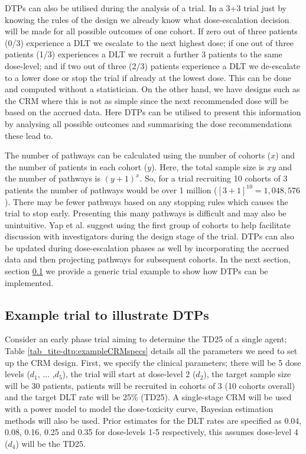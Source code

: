 DTPs can also be utilised during the analysis of a trial. In a 3+3 trial just by knowing the rules of the design we already know what dose-escalation decision will be made for all possible outcomes of one cohort. If zero out of three patients (0/3) experience a DLT we escalate to the next highest dose; if one out of three patients (1/3) experiences a DLT we recruit a further 3 patients to the same dose-level; and if two out of three (2/3) patients experience a DLT we de-escalate to a lower dose or stop the trial if already at the lowest dose. This can be done and computed without a statistician. On the other hand, we have designs such as the CRM where this is not as simple since the next recommended dose will be based on the accrued data. Here DTPs can be utilised to present this information by analysing all possible outcomes and summarising the dose recommendations these lead to.

The number of pathways can be calculated using the number of cohorts ($x$) and the number of patients in each cohort ($y$). Here, the total sample size is $xy$ and the number of pathways is $(y+1)^x$. So, for a trial recruiting 10 cohorts of 3 patients the number of pathways would be over 1 million ($[3+1]^{10} = 1,048,576$). There may be fewer pathways based on any stopping rules which causes the trial to stop early. Presenting this many pathways is difficult and may also be unintuitive. Yap et al. \cite{yapDoseTransitionPathways2017} suggest using the first group of cohorts to help facilitate discussion with investigators during the design stage of the trial. DTPs can also be updated during dose-escalation phases as well by incorporating the accrued data and then projecting pathways for subsequent cohorts. In the next section, section \ref{tite-dtp:Example-DTPs} we provide a generic trial example to show how DTPs can be implemented.  

\subsection{Example trial to illustrate DTPs}
\label{tite-dtp:Example-DTPs}

Consider an early phase trial aiming to determine the TD25 of a single agent; Table \ref{tab_tite-dtp:exampleCRMspecs} details all the parameters we need to set up the CRM design. First, we specify the clinical parameters; there will be 5 dose levels ($d_1$, ... ,$d_5$), the trial will start at dose-level 2 ($d_2$), the target sample size will be 30 patients, patients will be recruited in cohorts of 3 (10 cohorts overall) and the target DLT rate will be 25\% (TD25). A single-stage CRM will be used with a power model to model the dose-toxicity curve, Bayesian estimation methods will also be used. Prior estimates for the DLT rates are specified as 0.04, 0.08, 0.16, 0.25 and 0.35 for dose-levels 1-5 respectively, this assumes dose-level 4 ($d_4$) will be the TD25. 


